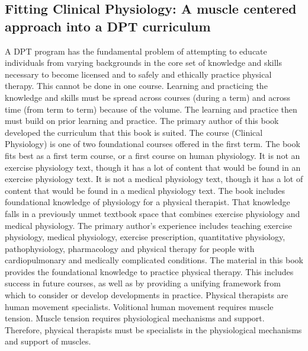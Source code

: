 \subsection{Fitting Clinical Physiology: A muscle centered approach into a DPT curriculum}
A DPT program has the fundamental problem of attempting to educate individuals from varying backgrounds in the core set of knowledge and skills necessary to become licensed and to safely and ethically practice physical therapy. This cannot be done in one course. Learning and practicing the knowledge and skills must be spread across courses (during a term) and across time (from term to term) because of the volume.  The learning and practice then must build on prior learning and practice. The primary author of this book developed the curriculum that this book is suited. The course (Clinical Physiology) is one of two foundational courses offered in the first term.\footnotemark{} The book fits best as a first term course, or a first course on human physiology.\footnotemark{} It is not an exercise physiology text, though it has a lot of content that would be found in an exercise physiology text. It is not a medical physiology text, though it has a lot of content that would be found in a medical physiology text. The book includes foundational knowledge of physiology for a physical therapist. That knowledge falls in a previously unmet textbook space that combines exercise physiology and medical physiology. The primary author's experience includes teaching exercise physiology, medical physiology, exercise prescription, quantitative physiology, pathophysiology, pharmacology and physical therapy for people with cardiopulmonary and medically complicated conditions. The material in this book provides the foundational knowledge to practice physical therapy. This includes success in future courses, as well as by providing a unifying framework from which to consider or develop developments in practice. Physical therapists are human movement specialists. Volitional human movement requires muscle tension. Muscle tension requires physiological mechanisms and support. Therefore, physical therapists must be specialists in the physiological mechanisms and support of muscles.

